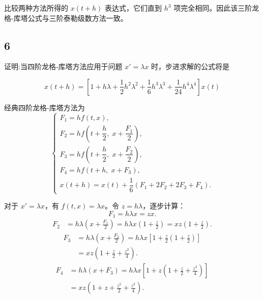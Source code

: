 \documentclass{article}
\begin{document}
比较两种方法所得的 $x(t+h)$ 表达式，它们直到 $h^3$ 项完全相同。因此该三阶龙格-库塔公式与三阶泰勒级数方法一致。

\subsection*{6}
证明:当四阶龙格-库塔方法应用于问题 \(x' = \lambda x\) 时，步进求解的公式将是

\[
x(t + h) = \left[1 + h\lambda + \frac{1}{2}h^2\lambda^2 + \frac{1}{6}h^3\lambda^3 + \frac{1}{24}h^4\lambda^4\right] x(t)
\]



经典四阶龙格-库塔方法为
\[
\begin{cases}
F_1 = h f(t, x), \\[4pt]
F_2 = h f\!\left(t + \dfrac{h}{2},\; x + \dfrac{F_1}{2}\right), \\[10pt]
F_3 = h f\!\left(t + \dfrac{h}{2},\; x + \dfrac{F_2}{2}\right), \\[10pt]
F_4 = h f(t + h,\; x + F_3), \\[8pt]
x(t+h) = x(t) + \dfrac{1}{6}(F_1 + 2F_2 + 2F_3 + F_4).
\end{cases}
\]

对于 $x' = \lambda x$，有 $f(t,x) = \lambda x$。令 $z = h\lambda$，逐步计算：
\[
F_1 = h\lambda x = z x.
\]
\[
\begin{aligned}
F_2 &= h\lambda\left(x + \frac{F_1}{2}\right) 
    = h\lambda x\left(1 + \frac{z}{2}\right) 
    = x z\left(1 + \frac{z}{2}\right).
\end{aligned}
\]
\[
\begin{aligned}
F_3 &= h\lambda\left(x + \frac{F_2}{2}\right) 
    = h\lambda x\left[1 + \frac{z}{2}\left(1 + \frac{z}{2}\right)\right] \\
    &= x z\left(1 + \frac{z}{2} + \frac{z^2}{4}\right).
\end{aligned}
\]
\[
\begin{aligned}
F_4 &= h\lambda(x + F_3) 
    = h\lambda x\left[1 + z\left(1 + \frac{z}{2} + \frac{z^2}{4}\right)\right] \\
    &= x z\left(1 + z + \frac{z^2}{2} + \frac{z^3}{4}\right).
\end{aligned}
\]
\end{document}
